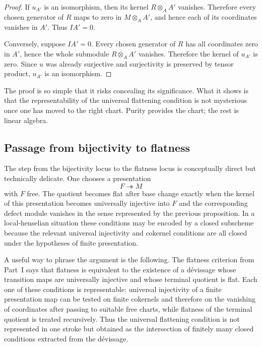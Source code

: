 \documentclass[11pt,oneside]{article}
\begin{document}
\begin{proof}
If $u_{A'}$ is an isomorphism, then its kernel $R\otimes_A A'$ vanishes.  Therefore every chosen generator of $R$ maps to zero in $M\otimes_A A'$, and hence each of its coordinates vanishes in $A'$.  Thus $IA'=0$.

Conversely, suppose $IA'=0$.  Every chosen generator of $R$ has all coordinates zero in $A'$, hence the whole submodule $R\otimes_A A'$ vanishes.  Therefore the kernel of $u_{A'}$ is zero.  Since $u$ was already surjective and surjectivity is preserved by tensor product, $u_{A'}$ is an isomorphism.
\end{proof}

The proof is so simple that it risks concealing its significance.  What it shows is that the representability of the universal flattening condition is not mysterious once one has moved to the right chart.  Purity provides the chart; the rest is linear algebra.

\subsection{Passage from bijectivity to flatness}

The step from the bijectivity locus to the flatness locus is conceptually direct but technically delicate.  One chooses a presentation
\[
F\twoheadrightarrow M
\]
with $F$ free.  The quotient becomes flat after base change exactly when the kernel of this presentation becomes universally injective into $F$ and the corresponding defect module vanishes in the sense represented by the previous proposition.  In a local-henselian situation these conditions may be encoded by a closed subscheme because the relevant universal injectivity and cokernel conditions are all closed under the hypotheses of finite presentation.

A useful way to phrase the argument is the following.  The flatness criterion from Part~I says that flatness is equivalent to the existence of a d\'evissage whose transition maps are universally injective and whose terminal quotient is flat.  Each one of these conditions is representable: universal injectivity of a finite presentation map can be tested on finite cokernels and therefore on the vanishing of coordinates after passing to suitable free charts, while flatness of the terminal quotient is treated recursively.  Thus the universal flattening condition is not represented in one stroke but obtained as the intersection of finitely many closed conditions extracted from the d\'evissage.
\end{document}
